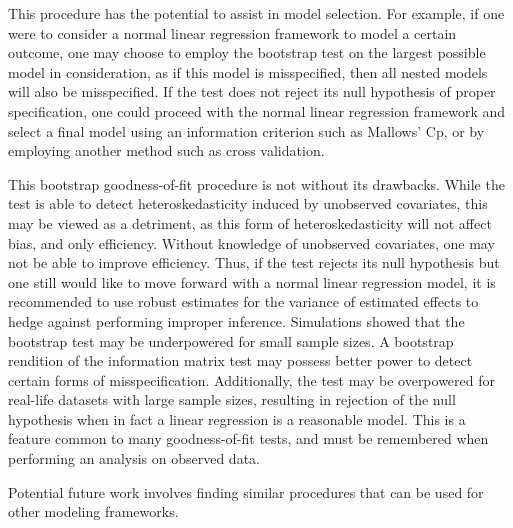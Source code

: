 \documentclass[submit]{smj}
\begin{document}
This procedure has the potential to assist in model selection. For example, if one were to consider a normal linear regression framework to model a certain outcome, one may
choose to employ the bootstrap test on the largest possible model in consideration, as if this model is misspecified, then all nested models will also be misspecified.
If the test does not reject its null hypothesis of proper specification, one could proceed with the normal linear regression framework and select a final model using
an information criterion such as Mallows' Cp, or by employing another method such as cross validation.

This bootstrap goodness-of-fit procedure is not without its drawbacks. While the test is able to detect heteroskedasticity induced by unobserved covariates, this may be viewed as a detriment,
as this form of heteroskedasticity will not affect bias, and only efficiency. Without knowledge of unobserved covariates, one may not be able to improve efficiency. Thus, if the test rejects its
null hypothesis but one still would like  to move forward with a normal linear regression model, it is recommended to use robust estimates for the variance of estimated effects
to hedge against performing improper inference. Simulations showed that the bootstrap test may be underpowered for small sample sizes. A bootstrap rendition of the information matrix test may
possess better power to detect certain forms of misspecification. Additionally, the test may be overpowered for real-life datasets with large sample sizes, resulting in rejection of the null hypothesis
when in fact a linear regression is a reasonable model. This is a feature common to many goodness-of-fit tests, and must be remembered when performing an analysis on observed data.

Potential future work involves finding similar procedures that can be used for other modeling frameworks.

\end{document}
